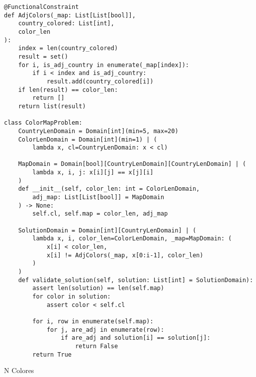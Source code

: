 \begin{listing}[!ht]
    \begin{verbatim}
@FunctionalConstraint
def AdjColors(_map: List[List[bool]], 
    country_colored: List[int], 
    color_len
):
    index = len(country_colored)
    result = set()
    for i, is_adj_country in enumerate(_map[index]):
        if i < index and is_adj_country:
            result.add(country_colored[i])
    if len(result) == color_len:
        return []
    return list(result)

class ColorMapProblem:
    CountryLenDomain = Domain[int](min=5, max=20)
    ColorLenDomain = Domain[int](min=1) | (
        lambda x, cl=CountryLenDomain: x < cl)

    MapDomain = Domain[bool][CountryLenDomain][CountryLenDomain] | (
        lambda x, i, j: x[i][j] == x[j][i]
    )
    def __init__(self, color_len: int = ColorLenDomain, 
        adj_map: List[List[bool]] = MapDomain
    ) -> None:
        self.cl, self.map = color_len, adj_map

    SolutionDomain = Domain[int][CountryLenDomain] | (
        lambda x, i, color_len=ColorLenDomain, _map=MapDomain: (
            x[i] < color_len,
            x[i] != AdjColors(_map, x[0:i-1], color_len)
        )
    )
    def validate_solution(self, solution: List[int] = SolutionDomain):
        assert len(solution) == len(self.map)
        for color in solution:
            assert color < self.cl

        for i, row in enumerate(self.map):
            for j, are_adj in enumerate(row):
                if are_adj and solution[i] == solution[j]:
                    return False
        return True
    \end{verbatim}
    \caption{N Colores}
    \label{lst:colors}
\end{listing}


